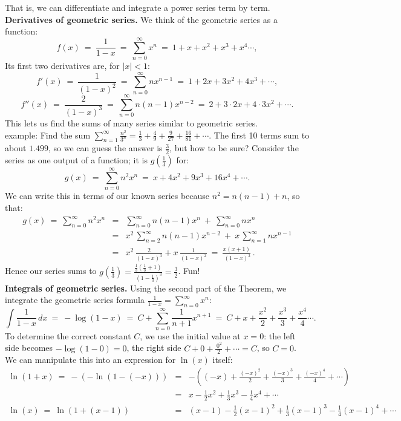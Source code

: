 \documentclass[11pt]{article}
\newcommand{\ds}{\displaystyle}
\begin{document}
\noindent
That is, we can differentiate and integrate a power series term by term.
\\[1em]
{\bf Derivatives of geometric series.}
We think of the geometric series as a function:
$$
f(x) \ =\ \frac{1}{1{-}x} \ =\ \sum_{n=0}^\infty x^n \ = \ 1 + x + x^2 + x^3 +x^4\cdots,
$$
Its first two derivatives are, for $|x|<1$:
$$
f'(x) \ =\ \frac{1}{(1{-}x)^2} \ =\ \sum_{n=0}^\infty nx^{n-1} \ = \ 1 + 2x + 3x^2 + 4x^3 +\cdots,
$$
$$
f''(x) \ =\ \frac{2}{(1{-}x)^3} \ =\ \sum_{n=0}^\infty n(n{-}1)x^{n-2} \ = \ 2 + 3\cdot2x + 4\cdot3x^2 +\cdots.
$$
This lets us find the sums of many series similar to geometric series.
\\[.5em]
{\sc example:} Find the sum $\ds\sum_{n=1}^\infty \frac{n^2}{3^n} = \frac{1}{3} + \frac{4}{9} + \frac{9}{27} + \frac{16}{81}+\cdots$. The first 10 terms sum to about $1.499$, so we can guess the answer is $\frac32$, but how to be sure?
Consider the series as one output of a function;
it is $g(\frac13)$ for:
$$
g(x) \ = \ \sum_{n=0}^\infty n^2x^n  \ =\ x+ 4x^2 + 9 x^3+ 16x^4+\cdots.
$$
We can write this in terms of our known series because $n^2 = n(n{-}1) + n$, so that:
$$\begin{array}{rcl}
g(x) \ = \ \sum_{n=0}^\infty n^2x^n &=&
 \sum_{n=0}^\infty n(n{-}1)x^n \ +\ \sum_{n=0}^\infty nx^n
\\[.5em]
 &=&
 x^2\,\sum_{n=2}^\infty n(n{-}1)x^{n-2} \ +\ x\,\sum_{n=1}^\infty nx^{n-1}
\\[.5em]
 &=&
 x^2\, \frac{2}{(1{-}x)^3} + x\, \frac{1}{(1{-}x)^2} 
\ =\ 
\frac{x(x{+}1)}{\ (1{-}x)^3}\,.
\end{array}$$
Hence our series sums to $g(\frac13) = \frac{\frac13(\frac13{+}1)}{\ (1{-}\frac13)^3}=\frac32$.  Fun!
\\[1em]
{\bf Integrals of geometric series.} Using the second part of the Theorem, we integrate
the geometric series formula $\frac 1{1-x}=\sum_{n=0}^\infty x^n$:
$$
\int\! \frac1{1-x}\,dx \ =\ -\log(1{-}x) \ =\ C+ \sum_{n=0}^\infty \frac1{n{+}1} x^{n+1} \ = \ C + x + \frac{x^2}2 + \frac{x^3}3 +\frac{x^4}4\cdots.
$$
To determine the correct constant $C$, we use the initial value at $x=0$:
the left side becomes $-\log(1-0)=0$, the right side $C + 0 +\frac{\,0^2}{2}+\cdots=C$, so $C=0$. We can manipulate this into an expression for $\ln(x)$ itself:
$$\begin{array}{rcl}
\ln(1{+}x) \ =\ 
-\left(-\ln(1{-}(-x))\right)
&=& 
-\left((-x) +\frac{(-x)^2}{2} +\frac{(-x)^3}{3} +\frac{(-x)^4}{4}+\cdots \right)
\\[.5em]
&=& 
x -\frac12 x^2 +\frac13 x^3 -\frac14 x^4 +\cdots 
\\[.5em]
\ln(x) \ =\ 
\ln(1{+}(x{-}1)) 
&=&
(x{-}1) -\frac12(x{-}1)^2 +\frac13 (x{-}1)^3 -\frac14 (x{-}1)^4 +\cdots
\end{array}$$
\end{document}
